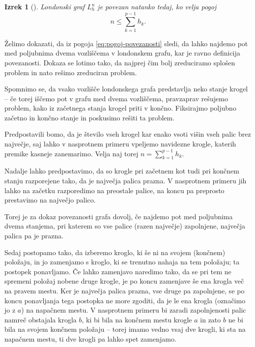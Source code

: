\documentclass[12pt,a4paper]{amsart}
\theoremstyle{definition} %
\theoremstyle{plain} %
\newtheorem{izrek}[definicija]{Izrek}
\begin{document}
\begin{izrek}[{\cite[Theorem~7.3.]{bib:tohmyths}}]
    Londonski graf $L_h^n$ je povezan natanko tedaj, ko velja pogoj
    \begin{equation}
        n \leq \sum_{k=1}^{p-1} h_k.
        \label{eq:pogoj-povezanosti}
    \end{equation}
\end{izrek}

\proof
    Želimo dokazati, da iz pogoja \eqref{eq:pogoj-povezanosti} sledi, da lahko najdemo pot med poljubnima dvema vozliščema v londonskem grafu, kar je ravno definicija povezanosti. Dokaza se lotimo tako, da najprej čim bolj zreduciramo splošen problem in nato rešimo zreduciran problem.
    
    Spomnimo se, da vsako vozlišče londonskega grafa predstavlja neko stanje krogel -- če torej iščemo pot v grafu med dvema vozliščema, pravzaprav rešujemo problem, kako iz začetnega stanja krogel priti v končno. Fiksirajmo poljubno začetno in končno stanje in poskusimo rešiti ta problem.
    
    Predpostavili bomo, da je število vseh krogel kar enako vsoti višin vseh palic brez največje, saj lahko v nasprotnem primeru vpeljemo navidezne krogle, katerih premike kasneje zanemarimo. Velja naj torej $n = \sum_{k=1}^{p-1}h_k$.
    
    Nadalje lahko predpostavimo, da so krogle pri začetnem kot tudi pri končnem stanju razporejene tako, da je največja palica prazna. V nasprotnem primeru jih lahko na začetku razporedimo na preostale palice, na koncu pa preprosto prestavimo na največjo palico.

    Torej je za dokaz povezanosti grafa dovolj, če najdemo pot med poljubnima dvema stanjema, pri katerem so vse palice (razen največje) zapolnjene, največja palica pa je prazna.
    
    Sedaj postopamo tako, da izberemo kroglo, ki še ni na svojem (končnem) položaju, in jo zamenjamo s kroglo, ki se trenutno nahaja na tem položaju; ta postopek ponavljamo. Če lahko zamenjavo naredimo tako, da se pri tem ne spremeni položaj nobene druge krogle, je po koncu zamenjave še ena krogla več na pravem mestu.
    Ker je največja palica prazna, vse druge pa zapolnjene, se po koncu ponavljanja tega postopka ne more zgoditi, da je le ena krogla (označimo jo z $a$) na napačnem mestu. V nasprotnem primeru bi zaradi zapolnjenosti palic namreč obstajala krogla $b$, ki bi bila na končnem mestu krogle $a$ in zato $b$ ne bi bila na svojem končnem položaju -- torej imamo vedno vsaj dve krogli, ki sta na napačnem mestu, ti dve krogli pa lahko spet zamenjamo.
    
\end{document}
